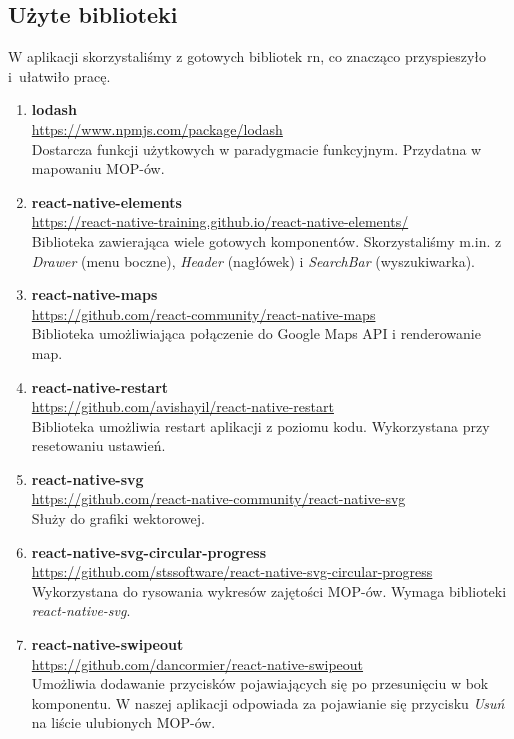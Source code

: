\subsection{Użyte biblioteki}
W aplikacji skorzystaliśmy z gotowych bibliotek \acrshort{rn}, co znacząco przyspieszyło i~ułatwiło pracę.
\begin{enumerate}
\item \textbf{lodash} \\
\url{https://www.npmjs.com/package/lodash}\\
Dostarcza funkcji użytkowych w paradygmacie funkcyjnym. Przydatna w mapowaniu MOP-ów.

\item \textbf{react-native-elements}\\
\url{https://react-native-training.github.io/react-native-elements/}\\ 
Biblioteka zawierająca wiele gotowych komponentów. Skorzystaliśmy m.in. z \textit{Drawer} (menu boczne), \textit{Header} (nagłówek) i \textit{SearchBar} (wyszukiwarka).

\item \textbf{react-native-maps} \\
\url{https://github.com/react-community/react-native-maps}\\
Biblioteka umożliwiająca połączenie do Google Maps API i renderowanie map.

\item \textbf{react-native-restart} \\
\url{https://github.com/avishayil/react-native-restart}\\
Biblioteka umożliwia restart aplikacji z poziomu kodu. Wykorzystana przy resetowaniu ustawień.

\item \textbf{react-native-svg} \\
\url{https://github.com/react-native-community/react-native-svg}\\
Służy do grafiki wektorowej.

\item \textbf{react-native-svg-circular-progress} \\
\url{https://github.com/stssoftware/react-native-svg-circular-progress}\\
Wykorzystana do rysowania wykresów zajętości MOP-ów. Wymaga biblioteki \textit{react-native-svg}.

\item \textbf{react-native-swipeout} \\
\url{https://github.com/dancormier/react-native-swipeout}\\
Umożliwia dodawanie przycisków pojawiających się po przesunięciu w bok komponentu. W naszej aplikacji odpowiada za pojawianie się przycisku \textit{Usuń} na liście ulubionych MOP-ów.


\end{enumerate}
